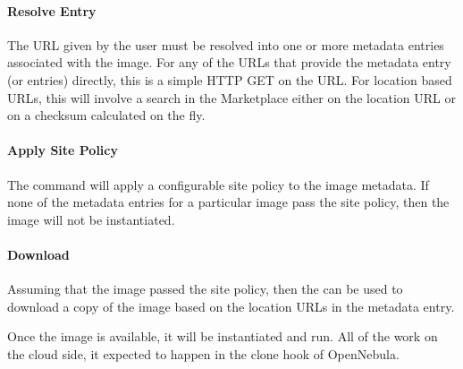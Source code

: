 \paragraph{Resolve Entry} The URL given by the user must be resolved into
  one or more metadata entries associated with the image.  For any of
  the URLs that provide the metadata entry (or entries) directly, this
  is a simple HTTP GET on the URL\@.  For location based URLs, this
  will involve a search in the Marketplace either on the location URL
  or on a checksum calculated on the fly.

\paragraph{Apply Site Policy} The command  will
  apply a configurable site policy to the image metadata.  If none of
  the metadata entries for a particular image pass the site policy,
  then the image will not be instantiated.

\paragraph{Download} Assuming that the image passed the site policy, then
  the  can be used to download a copy of
  the image based on the location URLs in the metadata entry.

Once the image is available, it will be instantiated and run.  All of
the work on the cloud side, it expected to happen in the clone hook of
OpenNebula\@.
